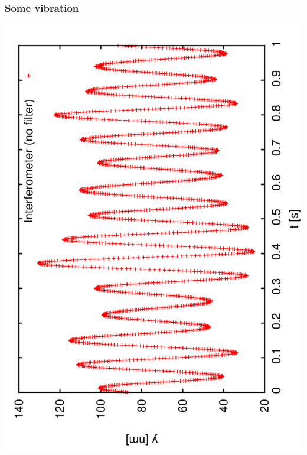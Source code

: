 \documentclass[a4paper,11pt]{book}
\begin{document}
\subsubsection{Some vibration}
\includegraphics[angle=-90,scale=0.20]{imagefft02.pdf}
\end{document}
